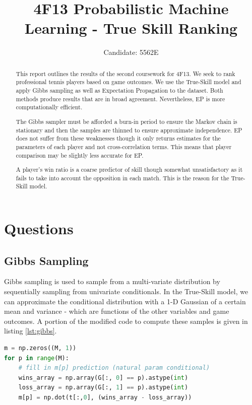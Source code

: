 \documentclass[]{article}
\title{4F13 Probabilistic Machine Learning - True Skill Ranking}
\author{Candidate: 5562E}
\begin{document}


\setcounter{page}{1}
\maketitle

\begin{abstract}
This report outlines the results of the second coursework for 4F13. We seek to rank professional tennis players based on game outcomes. We use the True-Skill model and apply Gibbs sampling as well as Expectation Propagation to the dataset. Both methods produce results that are in broad agreement. Nevertheless, EP is more computationally efficient.

The Gibbs sampler must be afforded a burn-in period to ensure the Markov chain is stationary and then the samples are thinned to ensure approximate independence. EP does not suffer from these weaknesses though it only returns estimates for the parameters of each player and not cross-correlation terms. This means that player comparison may be slightly less accurate for EP.

A player's win ratio is a coarse predictor of skill though somewhat unsatisfactory as it fails to take into account the opposition in each match. This is the reason for the True-Skill model.
\end{abstract}

\tableofcontents

\pagebreak
\section{Questions}
\subsection{Gibbs Sampling}

Gibbs sampling is used to sample from a multi-variate distribution by sequentially sampling from univariate conditionals. In the True-Skill model, we can approximate the conditional distribution with a 1-D Gaussian of a certain mean and variance - which are functions of the other variables and game outcomes. A portion of the modified code to compute these samples is given in listing \ref{lst:gibbs}.

\begin{lstlisting}[frame=single, caption={Gibbs sampling additions}, label={lst:gibbs}, language={python}]
m = np.zeros((M, 1))
for p in range(M):
	# fill in m[p] prediction (natural param conditional)
	wins_array = np.array(G[:, 0] == p).astype(int)
	loss_array = np.array(G[:, 1] == p).astype(int)
	m[p] = np.dot(t[:,0], (wins_array - loss_array))
\end{lstlisting}
\end{document}
